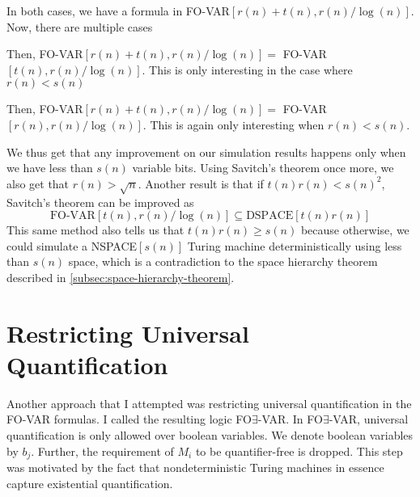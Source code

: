 In both cases, we have a formula in FO-VAR$[r(n) + t(n), r(n)/\log(n)]$.
Now, there are multiple cases
\begin{description}
    \setlength\itemsep{0.15em}
    \item[$r(n) \leq t(n)$:]  Then, FO-VAR$[r(n) + t(n), r(n)/\log(n)] =$ FO-VAR$[t(n), r(n)/\log(n)]$.
    This is only interesting in the case where $r(n) < s(n)$
    \item[$r(n) > t(n)$:] Then, FO-VAR$[r(n) + t(n), r(n)/\log(n)] =$ FO-VAR$[r(n), r(n)/\log(n)]$.
    This is again only interesting when $r(n) < s(n)$.
\end{description}

We thus get that any improvement on our simulation results happens only when we have less than $s(n)$ variable bits.
Using Savitch's theorem once more, we also get that $r(n) > \sqrt{n}$.
Another result is that if $t(n)r(n) < s(n)^2$, Savitch's theorem can be improved as
\[
    \text{FO-VAR}[t(n), r(n)/\log(n)] \subseteq \text{DSPACE}[t(n)r(n)]
\]
This same method also tells us that $t(n)r(n) \geq s(n)$ because otherwise, we could simulate a NSPACE$[s(n)]$ Turing machine deterministically using less than $s(n)$ space, which is a contradiction to the space hierarchy theorem described in \cref{subsec:space-hierarchy-theorem}.


\section{Restricting Universal Quantification}\label{sec:restricting-universal-quantification}

Another approach that I attempted was restricting universal quantification in the FO-VAR formulas.
I called the resulting logic FO$\exists$-VAR\@.
In FO$\exists$-VAR, universal quantification is only allowed over boolean variables.
We denote boolean variables by $b_j$.
Further, the requirement of $M_i$ to be quantifier-free is dropped.
This step was motivated by the fact that nondeterministic Turing machines in essence capture existential quantification.

